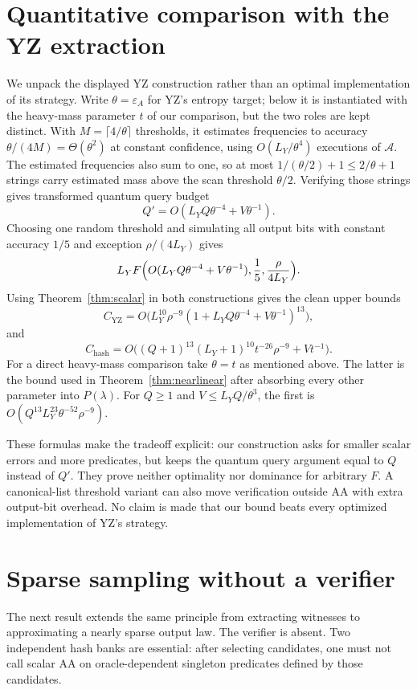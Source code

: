 \documentclass[11pt]{article}
\theoremstyle{definition}\newtheorem{definition}[theorem]{Definition}
\theoremstyle{remark}\newtheorem{remark}[theorem]{Remark}
\newcommand{\mc}{\mathcal}\newcommand{\eps}{\varepsilon}
\begin{document}
\section{Quantitative comparison with the YZ extraction}\label{app:comparison}
We unpack the displayed YZ construction rather than an optimal implementation of its strategy. Write \(\theta=\eps_A\) for YZ's entropy target; below it is instantiated with the heavy-mass parameter \(t\) of our comparison, but the two roles are kept distinct. With \(M=\lceil4/\theta\rceil\) thresholds, it estimates frequencies to accuracy \(\theta/(4M)=\Theta(\theta^2)\) at constant confidence, using \(O(L_Y/\theta^4)\) executions of \(\mc A\). The estimated frequencies also sum to one, so at most \(1/(\theta/2)+1\le2/\theta+1\) strings carry estimated mass above the scan threshold \(\theta/2\). Verifying those strings gives transformed quantum query budget
\[
 Q'=O(L_YQ\theta^{-4}+V\theta^{-1}).
\]
Choosing one random threshold and simulating all output bits with constant accuracy \(1/5\) and exception \(\rho/(4L_Y)\) gives
\[
 L_YF\Bigl(O(L_YQ\theta^{-4}+V\theta^{-1}),\frac15,\frac\rho{4L_Y}\Bigr).
\]
Using Theorem~\ref{thm:scalar} in both constructions gives the clean upper bounds
\[
 C_{\mathrm{YZ}}=O\bigl(L_Y^{10}\rho^{-9}(1+L_YQ\theta^{-4}+V\theta^{-1})^{13}\bigr),
\]
and
\[
 C_{\mathrm{hash}}=O\bigl((Q+1)^{13}(L_Y+1)^{10}t^{-26}\rho^{-9}+Vt^{-1}\bigr).
\]
For a direct heavy-mass comparison take \(\theta=t\) as mentioned above. The latter is the bound used in Theorem~\ref{thm:nearlinear} after absorbing every other parameter into \(P(\lambda)\). For \(Q\ge1\) and \(V\le L_YQ/\theta^3\), the first is \(O(Q^{13}L_Y^{23}\theta^{-52}\rho^{-9})\).

These formulas make the tradeoff explicit: our construction asks for smaller scalar errors and more predicates, but keeps the quantum query argument equal to \(Q\) instead of \(Q'\). They prove neither optimality nor dominance for arbitrary \(F\). A canonical-list threshold variant can also move verification outside AA with extra output-bit overhead. No claim is made that our bound beats every optimized implementation of YZ's strategy.

\section{Sparse sampling without a verifier}\label{app:sampling}
The next result extends the same principle from extracting witnesses to approximating a nearly sparse output law. The verifier is absent. Two independent hash banks are essential: after selecting candidates, one must not call scalar AA on oracle-dependent singleton predicates defined by those candidates.
\end{document}
